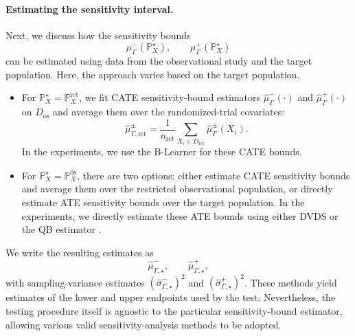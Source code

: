 \paragraph{Estimating the sensitivity interval.}
Next, we discuss how the sensitivity bounds
\[
  \mu^-_{\Gamma}(\mathbb{P}^{\star}_X),
  \qquad
  \mu^+_{\Gamma}(\mathbb{P}^{\star}_X)
\]
can be estimated using data from the observational study and the target population. Here, the approach varies based on the target population.
\begin{itemize}[leftmargin=*]
  \item For \(\mathbb{P}^{\star}_X=\mathbb{P}^{\mathrm{rct}}_X\), we fit CATE sensitivity-bound estimators \(\widehat{\mu}^-_{\Gamma}(\cdot)\) and \(\widehat{\mu}^+_{\Gamma}(\cdot)\) on \(D_{\mathrm{os}}\) and average them over the randomized-trial covariates:
  \[
    \widehat{\mu}^{\pm}_{\Gamma,\mathrm{rct}}
    =
    \frac{1}{n_{\mathrm{rct}}}
    \sum_{X_i \in D_{\mathrm{rct}}}
    \widehat{\mu}^{\pm}_{\Gamma}(X_i).
  \]
  In the experiments, we use the B-Learner \citep{oprescu2023b} for these CATE bounds.
  \item For \(\mathbb{P}^{\star}_X=\mathbb{P}^{\widetilde{\mathrm{os}}}_X\), there are two options: either estimate CATE sensitivity bounds and average them over the restricted observational population, or directly estimate ATE sensitivity bounds over the target population. In the experiments, we directly estimate these ATE bounds using either DVDS \citep{dorn2021doubly} or the QB estimator \citep{dorn2022sharp}.
\end{itemize}
We write the resulting estimates as
\[
  \widehat{\mu}^-_{\Gamma,\star},
  \qquad
  \widehat{\mu}^+_{\Gamma,\star},
\]
with sampling-variance estimates \((\widehat{\sigma}^-_{\Gamma,\star})^2\) and \((\widehat{\sigma}^+_{\Gamma,\star})^2\).
These methods yield estimates of the lower and upper endpoints used by the test. Nevertheless, the testing procedure itself is agnostic to the particular sensitivity-bound estimator, allowing various valid sensitivity-analysis methods to be adopted.

